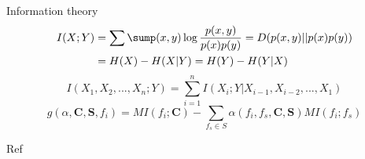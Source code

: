 \documentclass{beamer}
\begin{document}
\begin{frame}{Information theory}
\begin{equation}
\begin{split}
I(X;Y)&=\sum\sump(x,y)\log\dfrac{p(x,y)}{p(x)p(y)}=D(p(x,y)||p(x)p(y)) \\
&=H(X)-H(X|Y)=H(Y)-H(Y|X)
\end{split}
\end{equation}
\begin{equation}
I(X_{1},X_{2},...,X_{n};Y)=\sum^{n}_{i=1}I(X_{i};Y|X_{i-1},X_{i-2},...,X_{1})
\end{equation}
\begin{equation}
g(\alpha,\textbf{C},\textbf{S},f_{i})=MI(f_{i};\textbf{C})-\sum_{f_{s}\in S}\alpha(f_{i},f_{s},\textbf{C},\textbf{S})MI(f_{i};f_{s})
\end{equation}
\end{frame}

\begin{frame}{Ref}
\printbibliography
\end{frame}
\end{document}

